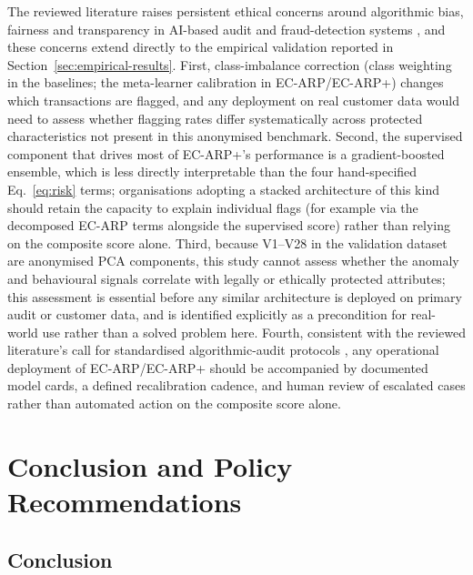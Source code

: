 \documentclass[preprint,12pt]{elsarticle}
\begin{document}
The reviewed literature raises persistent ethical concerns around algorithmic bias, fairness and transparency in AI-based audit and fraud-detection systems \citep{landers2023,baeyaert2025}, and these concerns extend directly to the empirical validation reported in Section~\ref{sec:empirical-results}. First, class-imbalance correction (class weighting in the baselines; the meta-learner calibration in EC-ARP/EC-ARP+) changes which transactions are flagged, and any deployment on real customer data would need to assess whether flagging rates differ systematically across protected characteristics not present in this anonymised benchmark. Second, the supervised component that drives most of EC-ARP+'s performance is a gradient-boosted ensemble, which is less directly interpretable than the four hand-specified Eq.~\eqref{eq:risk} terms; organisations adopting a stacked architecture of this kind should retain the capacity to explain individual flags (for example via the decomposed EC-ARP terms alongside the supervised score) rather than relying on the composite score alone. Third, because V1--V28 in the validation dataset are anonymised PCA components, this study cannot assess whether the anomaly and behavioural signals correlate with legally or ethically protected attributes; this assessment is essential before any similar architecture is deployed on primary audit or customer data, and is identified explicitly as a precondition for real-world use rather than a solved problem here. Fourth, consistent with the reviewed literature's call for standardised algorithmic-audit protocols \citep{akula2021}, any operational deployment of EC-ARP/EC-ARP+ should be accompanied by documented model cards, a defined recalibration cadence, and human review of escalated cases rather than automated action on the composite score alone.

\section{Conclusion and Policy Recommendations}
\label{sec:conclusion}

\subsection{Conclusion}
\end{document}
